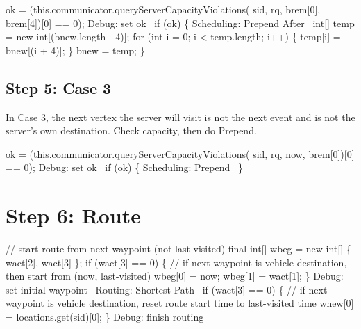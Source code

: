 \nwenddocs{}\endmoddef\nwstartdeflinemarkup{}\nwenddeflinemarkup
ok = (this.communicator.queryServerCapacityViolations(
    sid, rq, brem[0], brem[4])[0] == 0);
\LA{}Debug: set ok~{\nwtagstyle{}}\RA{}
if (ok) \{
  \LA{}Scheduling: Prepend After~{\nwtagstyle{}}\RA{}
  int[] temp = new int[(bnew.length - 4)];
  for (int i = 0; i < temp.length; i++) \{
    temp[i] = bnew[(i + 4)];
  \}
  bnew = temp;
\}
\nwendcode{}\nwdocspar

\subsection{Step 5: Case 3}

In Case 3, the next vertex the server will visit is not the next event and
is not the server's own destination. Check capacity, then do Prepend.

\nwenddocs{}\endmoddef\nwstartdeflinemarkup{}\nwenddeflinemarkup
ok = (this.communicator.queryServerCapacityViolations(
    sid, rq, now, brem[0])[0] == 0);
\LA{}Debug: set ok~{\nwtagstyle{}}\RA{}
if (ok) \{
  \LA{}Scheduling: Prepend~{\nwtagstyle{}}\RA{}
\}
\nwendcode{}\nwdocspar

\section{Step 6: Route}

\nwenddocs{}\endmoddef\nwstartdeflinemarkup{}\nwenddeflinemarkup
// start route from next waypoint (not last-visited)
final int[] wbeg = new int[] \{ wact[2], wact[3] \};
if (wact[3] == 0) \{
  // if next waypoint is vehicle destination, then start from (now, last-visited)
  wbeg[0] = now;
  wbeg[1] = wact[1];
\}
\LA{}Debug: set initial waypoint~{\nwtagstyle{}}\RA{}
\LA{}Routing: Shortest Path~{\nwtagstyle{}}\RA{}
if (wact[3] == 0) \{
  // if next waypoint is vehicle destination, reset route start time to last-visited time
  wnew[0] = locations.get(sid)[0];
\}
\LA{}Debug: finish routing~{\nwtagstyle{}}\RA{}
\nwendcode{}\nwdocspar


